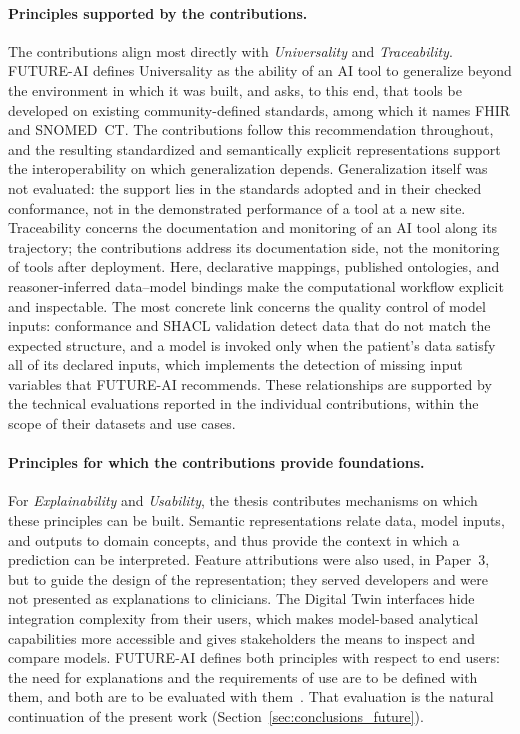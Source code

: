 \paragraph{Principles supported by the contributions.}
The contributions align most directly with \emph{Universality} and \emph{Traceability}. FUTURE-AI defines Universality as the ability of an AI tool to generalize beyond the environment in which it was built, and asks, to this end, that tools be developed on existing community-defined standards, among which it names FHIR and SNOMED~CT. The contributions follow this recommendation throughout, and the resulting standardized and semantically explicit representations support the interoperability on which generalization depends. Generalization itself was not evaluated: the support lies in the standards adopted and in their checked conformance, not in the demonstrated performance of a tool at a new site. Traceability concerns the documentation and monitoring of an AI tool along its trajectory; the contributions address its documentation side, not the monitoring of tools after deployment. Here, declarative mappings, published ontologies, and reasoner-inferred data--model bindings make the computational workflow explicit and inspectable. The most concrete link concerns the quality control of model inputs: conformance and SHACL validation detect data that do not match the expected structure, and a model is invoked only when the patient's data satisfy all of its declared inputs, which implements the detection of missing input variables that FUTURE-AI recommends. These relationships are supported by the technical evaluations reported in the individual contributions, within the scope of their datasets and use cases.

\paragraph{Principles for which the contributions provide foundations.}
For \emph{Explainability} and \emph{Usability}, the thesis contributes mechanisms on which these principles can be built. Semantic representations relate data, model inputs, and outputs to domain concepts, and thus provide the context in which a prediction can be interpreted. Feature attributions were also used, in Paper~3, but to guide the design of the representation; they served developers and were not presented as explanations to clinicians. The Digital Twin interfaces hide integration complexity from their users, which makes model-based analytical capabilities more accessible and gives stakeholders the means to inspect and compare models. FUTURE-AI defines both principles with respect to end users: the need for explanations and the requirements of use are to be defined with them, and both are to be evaluated with them~\cite{lekadir_future-ai_2025}. That evaluation is the natural continuation of the present work (Section~\ref{sec:conclusions_future}).

